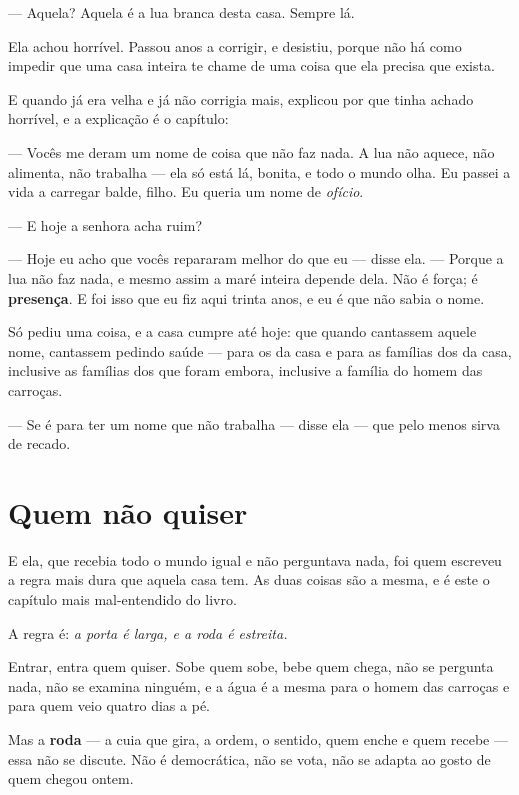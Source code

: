 \documentclass[livro.tex]{subfiles}
\begin{document}
--- Aquela? Aquela é a lua branca desta casa. Sempre lá.

\medskip

Ela achou horrível. Passou anos a corrigir, e desistiu, porque não há como impedir que uma casa
inteira te chame de uma coisa que ela precisa que exista.

E quando já era velha e já não corrigia mais, explicou por que tinha achado horrível, e a
explicação é o capítulo:

--- Vocês me deram um nome de coisa que não faz nada. A lua não aquece, não alimenta, não trabalha
--- ela só está lá, bonita, e todo o mundo olha. Eu passei a vida a carregar balde, filho. Eu
queria um nome de \emph{ofício}.

--- E hoje a senhora acha ruim?

--- Hoje eu acho que vocês repararam melhor do que eu --- disse ela. --- Porque a lua não faz
nada, e mesmo assim a maré inteira depende dela. Não é força; é \textbf{presença}. E foi isso que
eu fiz aqui trinta anos, e eu é que não sabia o nome.

\medskip

Só pediu uma coisa, e a casa cumpre até hoje: que quando cantassem aquele nome, cantassem
pedindo saúde --- para os da casa e para as famílias dos da casa, inclusive as famílias dos que
foram embora, inclusive a família do homem das carroças.

--- Se é para ter um nome que não trabalha --- disse ela --- que pelo menos sirva de recado.

\section{Quem não quiser}

E ela, que recebia todo o mundo igual e não perguntava nada, foi quem escreveu a regra mais dura
que aquela casa tem. As duas coisas são a mesma, e é este o capítulo mais mal-entendido do livro.

\medskip

A regra é: \emph{a porta é larga, e a roda é estreita.}

Entrar, entra quem quiser. Sobe quem sobe, bebe quem chega, não se pergunta nada, não se examina
ninguém, e a água é a mesma para o homem das carroças e para quem veio quatro dias a pé.

Mas a \textbf{roda} --- a cuia que gira, a ordem, o sentido, quem enche e quem recebe --- essa não
se discute. Não é democrática, não se vota, não se adapta ao gosto de quem chegou ontem.
\end{document}
